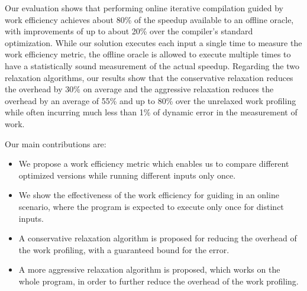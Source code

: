     Our evaluation shows that performing online iterative compilation guided by work efficiency achieves about 80\% of the speedup
    available to an offline oracle, with improvements of up to about 20\% over the compiler's standard optimization. While our solution
    executes each input a single time to measure the work efficiency metric, the offline oracle is allowed to execute multiple times to
    have a statistically sound measurement of the actual speedup. Regarding the two relaxation algorithms, our results show that the
    conservative relaxation reduces the overhead by 30\% on average and the aggressive relaxation reduces the overhead by an average of
    55\% and up to 80\% over the unrelaxed work profiling while often incurring much less than 1\% of dynamic error in the measurement of
    work.

    Our main contributions are:

    \begin{itemize}[leftmargin=3mm]

        \item We propose a work efficiency metric which enables us to compare different optimized versions while running different inputs
        only once.

        \item We show the effectiveness of the work efficiency for guiding {\itercomp} in an online scenario, where the program is expected
        to execute only once for distinct inputs.

        \item A conservative relaxation algorithm is proposed for reducing the overhead of the work profiling, with a guaranteed bound for
        the error.

        \item A more aggressive relaxation algorithm is proposed, which works on the whole program, in order to further reduce the overhead
        of the work profiling.
    \end{itemize}

